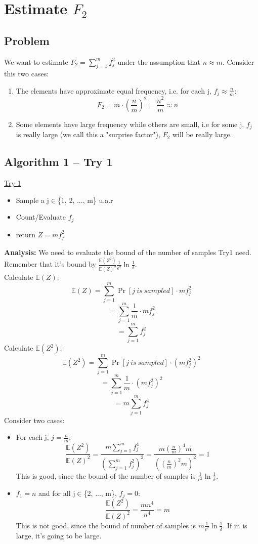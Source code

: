 \documentclass[11pt]{article}
\begin{document}
\section{Estimate $F_2$}
\subsection{Problem}
We want to estimate $F_2 = \sum_{j=1}^m f_j^2$ under the assumption that $n\approx m$. Consider this two cases:
\begin{enumerate}
    \item The elements have approximate equal frequency, i.e. for each j, $f_j \approx \frac{n}{m}$: $$F_2 = m\cdot(\frac{n}{m})^2 = \frac{n^2}{m} \approx n$$
    \item Some elements have large frequency while others are small, i.e for some j, $f_j$ is really large (we call this a "surprise factor"), $F_2$ will be really large.
\end{enumerate}

\subsection{Algorithm 1 -- Try 1}
\begin{mdframed}[backgroundcolor=blue!05,topline=false,bottomline=false,leftline=false,rightline=false] 
	\underline{\sc Try 1}
	\begin{itemize}
		\item Sample a j$\in$\{1, 2, ..., m\} u.a.r
		\item Count/Evaluate $f_j$
		\item return $Z=mf_j^2$
	\end{itemize}
\end{mdframed}
\textbf{Analysis:} We need to evaluate the bound of the number of samples Try1 need. Remember that it's bound by $\frac{\mathbb{E}(Z^2)}{\mathbb{E}(Z)^2}\frac{1}{\epsilon^2}\ln{\frac{1}{\delta}} $.\\
Calculate $\mathbb{E}(Z)$:
$$\mathbb{E}{(Z)} = \sum_{j=1}^m\Pr[j\ is\ sampled]\cdot mf_j^2$$
$$= \sum_{j=1}^m \frac{1}{m} \cdot mf_j^2$$
$$= \sum_{j=1}^m f_j^2$$
Calculate $\mathbb{E}(Z^2)$:
$$\mathbb{E}(Z^2)=\sum_{j=1}^m\Pr[j\ is\ sampled]\cdot (mf_j^2)^2$$
$$=\sum_{j=1}^m \frac{1}{m} \cdot (mf_j^2)^2$$
$$=m\sum_{j=1}^m f_j^4$$
Consider two cases:
\begin{itemize}
    \item For each j, $j =\frac{n}{m}$:
    $$\frac{\mathbb{E}(Z^2)}{\mathbb{E}(Z)^2} = \frac{m\sum_{j=1}^m f_j^4}{(\sum_{j=1}^m f_j^2)^2} = \frac{m(\frac{n}{m})^4m}{((\frac{n}{m})^2 m)^2} = 1$$
    This is good, since the bound of the number of samples is $\frac{1}{\epsilon^2}\ln{\frac{1}{\delta}} $.
    
    \item $f_1=n$ and for all j$\in$\{2, ..., m\}, $f_j=0$:
    $$\frac{\mathbb{E}(Z^2)}{\mathbb{E}(Z)^2} = \frac{mn^4}{n^4} = m $$
    This is not good, since the bound of number of samples is $m\frac{1}{\epsilon^2}\ln{\frac{1}{\delta}} $. If m is large, it's going to be large.
\end{itemize}
\newpage
\end{document}
